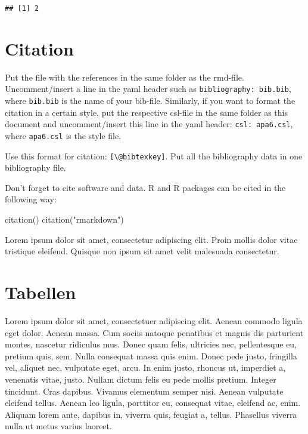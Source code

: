 \documentclass[11pt,a4paper,oneside]{article}
\newenvironment{Shaded}{\begin{snugshade}}{\end{snugshade}}
\newcommand{\FunctionTok}[1]{\textcolor[rgb]{0.00,0.00,0.00}{#1}}
\newcommand{\NormalTok}[1]{#1}
\newcommand{\StringTok}[1]{\textcolor[rgb]{0.31,0.60,0.02}{#1}}
\begin{document}
\begin{verbatim}
## [1] 2
\end{verbatim}

\hypertarget{citation}{%
\section{Citation}\label{citation}}

Put the file with the references in the same folder as the rmd-file.
Uncomment/insert a line in the yaml header such as
\texttt{bibliography:\ bib.bib}, where \texttt{bib.bib} is the name of
your bib-file. Similarly, if you want to format the citation in a
certain style, put the respective csl-file in the same folder as this
document and uncomment/insert this line in the yaml header:
\texttt{csl:\ apa6.csl}, where \texttt{apa6.csl} is the style file.

Use this format for citation: \texttt{{[}\textbackslash{}@bibtexkey{]}}.
Put all the bibliography data in one bibliography file.

Don't forget to cite software and data. R and R packages can be cited in
the following way:

\begin{Shaded}
\begin{Highlighting}[]
\FunctionTok{citation}\NormalTok{()}
\FunctionTok{citation}\NormalTok{(}\StringTok{"rmarkdown"}\NormalTok{)}
\end{Highlighting}
\end{Shaded}

Lorem ipsum dolor sit amet, consectetur adipiscing elit. Proin mollis
dolor vitae tristique eleifend. Quisque non ipsum sit amet velit
malesuada consectetur.

\hypertarget{tabellen}{%
\section{Tabellen}\label{tabellen}}

Lorem ipsum dolor sit amet, consectetuer adipiscing elit. Aenean commodo
ligula eget dolor. Aenean massa. Cum sociis natoque penatibus et magnis
dis parturient montes, nascetur ridiculus mus. Donec quam felis,
ultricies nec, pellentesque eu, pretium quis, sem. Nulla consequat massa
quis enim. Donec pede justo, fringilla vel, aliquet nec, vulputate eget,
arcu. In enim justo, rhoncus ut, imperdiet a, venenatis vitae, justo.
Nullam dictum felis eu pede mollis pretium. Integer tincidunt. Cras
dapibus. Vivamus elementum semper nisi. Aenean vulputate eleifend
tellus. Aenean leo ligula, porttitor eu, consequat vitae, eleifend ac,
enim. Aliquam lorem ante, dapibus in, viverra quis, feugiat a, tellus.
Phasellus viverra nulla ut metus varius laoreet.
\end{document}
